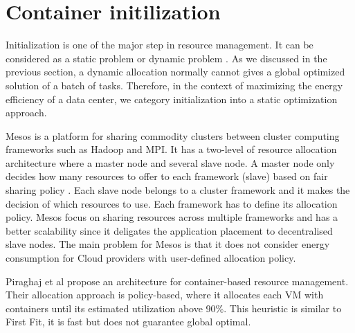 
\section{Container initilization}
Initialization is one of the major step in resource management. It can be considered as a static problem \cite{Jennings:2015ht} or dynamic problem \cite{Beloglazov:2012bw}. 
As we discussed in the previous section, a dynamic allocation normally cannot gives a global optimized solution of a batch of tasks. Therefore, in the context of maximizing the energy efficiency of a data center, we category initialization into a static optimization approach.

Mesos \cite{Hindman:2011ux} is a platform for sharing commodity clusters between cluster computing frameworks such as Hadoop and MPI. It has a two-level of resource allocation architecture where a master node and several slave node. A master node only decides how many resources to offer to each framework (slave) based on fair sharing policy \cite{Ghodsi:2011vm}. Each slave node belongs to a cluster framework and it makes the decision of which resources to use. Each framework has to define its allocation policy. Mesos focus on sharing resources across multiple frameworks and has a better scalability since it deligates the application placement to decentralised slave nodes. The main problem for Mesos is that it does not consider energy consumption for Cloud providers with user-defined allocation policy.

Piraghaj et al \cite{Piraghaj:2016bw} propose an architecture for container-based resource management. Their allocation approach is policy-based, where it allocates each VM with containers until its estimated utilization above 90\%. This heuristic is similar to First Fit, it is fast but does not guarantee global optimal.
